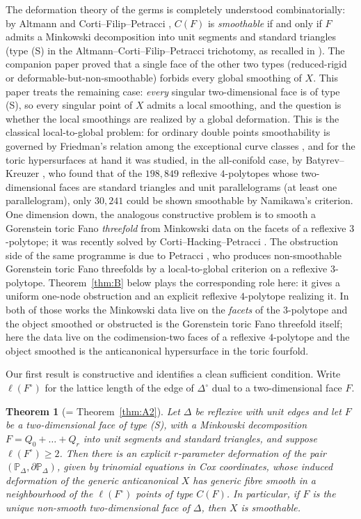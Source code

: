 \documentclass[11pt]{amsart}
\newtheorem{theorem}{Theorem}[section]
\theoremstyle{definition}
\theoremstyle{remark}
\newcommand{\PP}{\mathbb{P}}
\begin{document}
The deformation theory of the germs is completely understood
combinatorially: by Altmann \cite{Altmann97} and
Corti--Filip--Petracci \cite{CFP}, $C(F)$ is \emph{smoothable} if and only
if $F$ admits a Minkowski decomposition into unit segments and standard
triangles (type (S) in the Altmann--Corti--Filip--Petracci trichotomy,
as recalled in \cite[Thm.~2.2]{paper1}).  The companion paper
proved that a single face of the other two types (reduced-rigid or
deformable-but-non-smoothable) forbids every global smoothing of $X$.
This paper treats the remaining case: \emph{every} singular
two-dimensional face is of type (S), so every singular point of $X$
admits a local smoothing, and the question is whether the local
smoothings are realized by a global deformation.  This is the classical
local-to-global problem: for ordinary double points smoothability is
governed by
Friedman's relation among the exceptional curve classes
\cite{Friedman86,RollenskeThomas}, and for the toric hypersurfaces at
hand it was studied, in the all-conifold case, by Batyrev--Kreuzer
\cite{BK10}, who found that of the $198{,}849$ reflexive $4$-polytopes
whose two-dimensional faces are standard triangles and unit
parallelograms (at least one parallelogram),
only $30{,}241$ could be shown smoothable by Namikawa's criterion.
One dimension down, the analogous constructive problem is to smooth a
Gorenstein toric Fano \emph{threefold} from Minkowski data on the facets
of a reflexive $3$-polytope; it was recently solved by
Corti--Hacking--Petracci \cite{CHP24}.  The obstruction side of the same
programme is due to Petracci \cite{Petracci20}, who produces
non-smoothable Gorenstein toric Fano threefolds by a local-to-global
criterion on a reflexive $3$-polytope.  Theorem~\ref{thm:B} below plays
the corresponding role here: it gives a uniform one-node obstruction and
an explicit reflexive $4$-polytope realizing it.  In both of those works the Minkowski data live on
the \emph{facets} of the $3$-polytope and the object smoothed or
obstructed is the Gorenstein toric Fano threefold itself; here the data
live on the
codimension-two faces of a reflexive $4$-polytope and the object smoothed
is the anticanonical hypersurface in the toric fourfold.

Our first result is constructive and identifies a clean sufficient
condition.  Write $\ell(F^\circ)$ for the lattice length of the edge of
$\Delta^\circ$ dual to a two-dimensional face $F$.

\begin{theorem}[= Theorem~\ref{thm:A2}]\label{thm:A}
Let $\Delta$ be reflexive with unit edges and let $F$ be a
two-dimensional face of type \textup{(S)}, with a Minkowski decomposition
$F = Q_0 + \dots + Q_r$ into unit segments and standard triangles, and
suppose $\ell(F^\circ) \ge 2$.  Then there is an explicit $r$-parameter
deformation of the pair $(\PP_\Delta, \partial\PP_\Delta)$, given by
trinomial equations in Cox coordinates, whose induced deformation of the
generic anticanonical $X$ has generic fibre smooth in a neighbourhood of
the $\ell(F^\circ)$ points of type $C(F)$.  In particular, if $F$ is the
\emph{unique} non-smooth two-dimensional face of $\Delta$, then $X$ is
smoothable.
\end{theorem}
\end{document}
